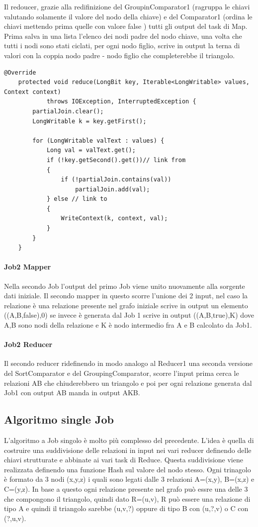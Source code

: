 \documentclass[paper=a4, fontsize=11pt]{scrartcl}	%
\numberwithin{equation}{section}															%
\numberwithin{figure}{section}																%
\numberwithin{table}{section}																%
\begin{document}
Il redoucer, grazie alla redifinizione del GroupinComparator1 (ragruppa le chiavi valutando solamente il valore del nodo della chiave) e  del Comparator1 (ordina le chiavi mettendo prima quelle con valore false ) tutti gli output del task di Map. Prima salva in una lista l'elenco dei nodi padre del nodo chiave, una volta che tutti i nodi sono stati ciclati, per ogni nodo figlio, scrive in output la terna di valori con la coppia nodo padre - nodo figlio che completerebbe il triangolo.
\begin{lstlisting}[label=Reducer1,caption=Implementazione del Reducer1]	
	@Override
	protected void reduce(LongBit key, Iterable<LongWritable> values, Context context)
			throws IOException, InterruptedException {
		partialJoin.clear();
		LongWritable k = key.getFirst();

		for (LongWritable valText : values) {
			Long val = valText.get();
			if (!key.getSecond().get())// link from
			{
				if (!partialJoin.contains(val))
					partialJoin.add(val);
			} else // link to
			{
				WriteContext(k, context, val);
			}
		}
	}
\end{lstlisting}
\paragraph{Job2 Mapper}
Nella secondo Job l'output del primo Job viene unito nuovamente alla sorgente dati iniziale. Il secondo mapper in questo scorre l'unione dei 2 input, nel caso la relazione è una relazione presente nel grafo iniziale scrive in output un elemento ((A,B,false),0) se invece è generata dal Job 1 scrive in output  ((A,B,true),K) dove A,B sono nodi della relazione e K è nodo intermedio fra A e B calcolato da Job1.
\paragraph{Job2 Reducer}
Il secondo reducer ridefinendo in modo analogo al Reducer1 una seconda versione del SortComparator e del GroupingComparator, scorre l'input prima cerca le relazioni AB che chiuderebbero un triangolo e poi per ogni relazione generata dal Job1 con output AB manda in output AKB.

\subsection{Algoritmo single Job}
L'algoritmo a Job singolo è molto più complesso del precedente.
L'idea è quella di costruire una suddivisione delle relazioni in input nei vari reducer definendo delle chiavi strutturate e abbinate ai vari task di Reduce. Questa suddivisione viene realizzata definendo una funzione Hash sul valore del nodo stesso.
Ogni trinagolo è formato da  3 nodi (x,y,z) i quali sono legati dalle 3 relazioni A=(x,y), B=(x,z) e C=(y,z). In base a questo ogni relazione presente nel grafo può essre una delle 3 che compongono il triangolo, quindi dato R=(u,v), R può essere una relazione di tipo A e quindi  il triangolo sarebbe (u,v,?) oppure di tipo B con (u,?,v) o C con (?,u,v).
\end{document}
